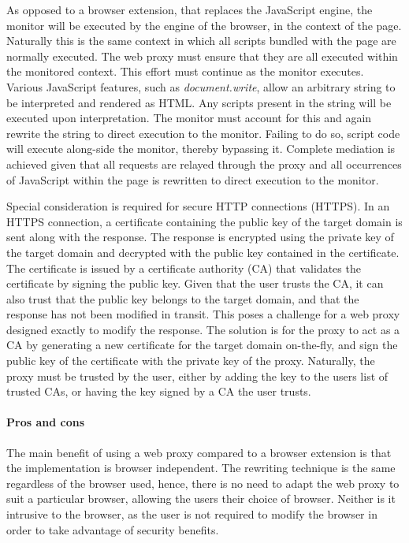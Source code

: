 \documentclass{llncs}
\newcommand{\todo}[1]{\colorbox{red}{\textcolor{white}{\sffamily\bfseries\scriptsize TODO}} \textcolor{red}{#1} \textcolor{red}{$\blacktriangleleft$}}
\begin{document}
As opposed to a browser extension, that replaces the 
JavaScript engine, the monitor will be executed by the engine of the browser, in the context of the page. Naturally 
this is the same context in which all scripts bundled with the 
page are normally executed. The web proxy must ensure that they are all executed within the 
monitored context. This effort must continue as the monitor executes. 
Various JavaScript features, such as 
\emph{document.write}, allow an arbitrary string to be 
interpreted and rendered as HTML. Any scripts present in the string will be 
executed upon interpretation. The monitor must account for this and again rewrite 
the string to direct execution to the monitor. Failing to do so, script code will execute 
along-side the monitor, thereby bypassing it. 
Complete mediation is achieved given that all requests are relayed through the proxy 
and all occurrences of JavaScript within the page is rewritten to direct execution to the monitor.

Special consideration is required for secure HTTP connections (HTTPS). In an HTTPS 
connection, a certificate containing the public key of the target domain is sent 
along with the response. The response is encrypted using the private key of the target 
domain and decrypted with the public key contained in the certificate. The 
certificate is issued by a certificate authority (CA)
that validates the certificate by signing the public key. Given that the user 
trusts the CA, it can also trust that the public key belongs 
to the target domain, and that the response has not been modified in transit.
This poses a challenge for a web proxy designed exactly to modify the response. The solution 
is for the proxy to act as a CA by generating a
new certificate for the target domain on-the-fly, and sign the 
public key of the certificate with the private key of the proxy. Naturally, 
the proxy must be trusted by the user, either by adding the key to 
the users list of trusted CAs, or having the key signed by a CA the user trusts.



\paragraph{Pros and cons}
The main benefit of using a web proxy 
compared to a browser extension is that the implementation is browser independent. The 
rewriting technique is the same regardless of the browser used, hence, there is no 
need to adapt the web proxy to suit a particular browser, allowing 
the users their choice of browser.
Neither is it intrusive to the browser, as the user is not required to modify the 
browser in order to take advantage of security benefits. 
\end{document}
